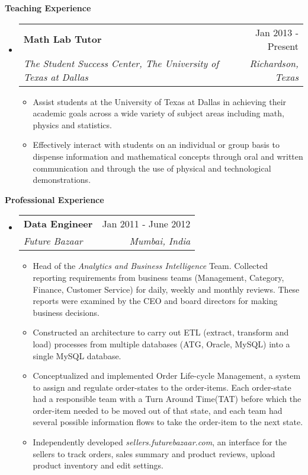 \documentclass[letterpaper,11pt]{article}
\makeatletter
\newcommand{\resitem}[1]{\item[\ding{226}] #1 \vspace{-2pt}}
\newcommand{\resheading}[1]{{\large \colorbox{mygrey}{\begin{minipage}{\textwidth}{\textbf{#1 \vphantom{p\^{E}}}}\end{minipage}}}}
\newcommand{\ressubheading}[4]{
\begin{tabular*}{7.0in}{l@{\extracolsep{\fill}}r}
		\textbf{#1} & #2 \\
		\textit{#3} & \textit{#4} \\
\end{tabular*}\vspace{-6pt}}
\makeatother
\begin{document}
\resheading{Teaching Experience}
\begin{itemize}

\item
	\ressubheading{Math Lab Tutor}{Jan 2013 - Present}{The Student Success Center, The University of Texas at Dallas}{Richardson, Texas} 
	\begin{itemize}
		\resitem{Assist students at the University of Texas at Dallas in achieving their academic goals across a wide variety of subject areas including math, physics and statistics.}
		\resitem{Effectively interact with students on an individual or group basis to dispense information and mathematical concepts through oral and written communication and through the use of physical and technological demonstrations.}
	\end{itemize}

\end{itemize}

\resheading{Professional Experience}
\begin{itemize}
\item
	\ressubheading{Data Engineer}{Jan 2011 - June 2012}{Future Bazaar}{Mumbai, India}
	\begin{itemize}
		\resitem{Head of the \textit{Analytics and Business Intelligence} Team. Collected reporting requirements from business teams (Management, Category, Finance, Customer Service) for daily, weekly and monthly reviews. These reports were examined by the CEO and board directors for making business decisions.}
		\resitem{Constructed an architecture to carry out ETL (extract, transform and load) processes from multiple databases (ATG, Oracle, MySQL) into a single MySQL database.}
		\resitem{Conceptualized and implemented Order Life-cycle Management, a system to assign and regulate order-states to the order-items. Each order-state had a responsible team with a Turn Around Time(TAT) before which the order-item needed to be moved out of that state, and each team had several possible information flows to take the order-item to the next state.}
		\resitem{Independently developed \textit{sellers.futurebazaar.com}, an interface for the sellers to track orders, sales summary and product reviews, upload product inventory and edit settings.}
	\end{itemize}
\end{itemize}
\end{document}
